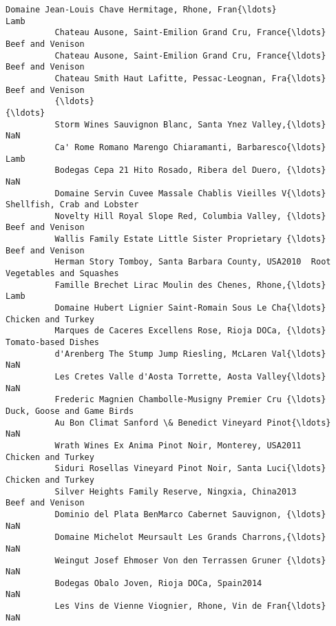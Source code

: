 \documentclass[11pt]{article}
\begin{document}
\begin{Verbatim}[commandchars=\\\{\}]
          Domaine Jean-Louis Chave Hermitage, Rhone, Fran{\ldots}                          Lamb   
          Chateau Ausone, Saint-Emilion Grand Cru, France{\ldots}              Beef and Venison   
          Chateau Ausone, Saint-Emilion Grand Cru, France{\ldots}              Beef and Venison   
          Chateau Smith Haut Lafitte, Pessac-Leognan, Fra{\ldots}              Beef and Venison   
          {\ldots}                                                                          {\ldots}   
          Storm Wines Sauvignon Blanc, Santa Ynez Valley,{\ldots}                           NaN   
          Ca' Rome Romano Marengo Chiaramanti, Barbaresco{\ldots}                          Lamb   
          Bodegas Cepa 21 Hito Rosado, Ribera del Duero, {\ldots}                           NaN   
          Domaine Servin Cuvee Massale Chablis Vieilles V{\ldots}   Shellfish, Crab and Lobster   
          Novelty Hill Royal Slope Red, Columbia Valley, {\ldots}              Beef and Venison   
          Wallis Family Estate Little Sister Proprietary {\ldots}              Beef and Venison   
          Herman Story Tomboy, Santa Barbara County, USA2010  Root Vegetables and Squashes   
          Famille Brechet Lirac Moulin des Chenes, Rhone,{\ldots}                          Lamb   
          Domaine Hubert Lignier Saint-Romain Sous Le Cha{\ldots}            Chicken and Turkey   
          Marques de Caceres Excellens Rose, Rioja DOCa, {\ldots}           Tomato-based Dishes   
          d'Arenberg The Stump Jump Riesling, McLaren Val{\ldots}                           NaN   
          Les Cretes Valle d'Aosta Torrette, Aosta Valley{\ldots}                           NaN   
          Frederic Magnien Chambolle-Musigny Premier Cru {\ldots}    Duck, Goose and Game Birds   
          Au Bon Climat Sanford \& Benedict Vineyard Pinot{\ldots}                           NaN   
          Wrath Wines Ex Anima Pinot Noir, Monterey, USA2011            Chicken and Turkey   
          Siduri Rosellas Vineyard Pinot Noir, Santa Luci{\ldots}            Chicken and Turkey   
          Silver Heights Family Reserve, Ningxia, China2013               Beef and Venison   
          Dominio del Plata BenMarco Cabernet Sauvignon, {\ldots}                           NaN   
          Domaine Michelot Meursault Les Grands Charrons,{\ldots}                           NaN   
          Weingut Josef Ehmoser Von den Terrassen Gruner {\ldots}                           NaN   
          Bodegas Obalo Joven, Rioja DOCa, Spain2014                                   NaN   
          Les Vins de Vienne Viognier, Rhone, Vin de Fran{\ldots}                           NaN   

\end{Verbatim}
\end{document}
